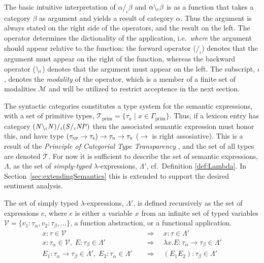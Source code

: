 The basic intuitive interpretation of $\alpha /_\iota \beta$ and $\alpha \backslash_\iota \beta$ is as a function that takes a category $\beta$ as argument and yields a result of category $\alpha$. Thus the argument is always stated on the right side of the operators, and the result on the left. The operator determines the dictionality of the application, i.e.\ \emph{where} the argument should appear relative to the function: the forward operator ($/_\iota$) denotes that the argument must appear on the right of the function, whereas the backward operator ($\backslash_\iota$) denotes that the argument must appear on the left. The subscript, $\iota$, denotes the \emph{modality} of the operator, which is a member of a finite set of modalities $\mathcal{M}$ and will be utilized to restrict acceptence in the next section. 

The syntactic categories constitutes a type system for the semantic expressions, with a set of primitive types, $\mathcal{T}_\mathrm{prim} = \{ \tau_x \; | \; x \in \Gamma_\mathrm{prim} \}$. Thus, if a lexicon entry has category $({\mathit{N}} \backslash_\iota {\mathit{N}}) /_\iota ({\mathit{S}} /_\iota {\mathit{NP}})$ then the associated semantic expression must honor this, and have type $(\tau_\textsc{np} \to \tau_\textsc{s}) \to \tau_\textsc{n} \to \tau_\textsc{n}$ ($\to$ is right assosiative). This is a result of the \emph{Principle of Categorial Type Transparency} \cite[Montague, 1974]{??}, and the set of all types are denoted $\mathcal{T}$. For now it is sufficient to describe the set of semantic expressions, $\Lambda$, as the set of \emph{simply-typed} $\lambda$-expressions, $\Lambda'$, cf.\ Definition \ref{def:Lambda}. In Section~\ref{sec:extendingSemantics} this is extended to support the desired sentiment analysis.

\begin{definition}
The set of simply typed $\lambda$-expressions, $\Lambda'$, is defined recursively as the set of expressions $e$, where $e$ is either a variable $x$ from an infinite set of typed variables $\mathcal{V} = \{ v_1 : \tau_\alpha, v_2 : \tau_\beta, \ldots \}$, a function abstraction, or a functional application.
\begin{align}
 x : \tau \in \mathcal{V}                      &\quad \Rightarrow \quad  x  : \tau \in \Lambda' \tag{Variable} \\
 x : \tau_\alpha \in \mathcal{V}, \; E : \tau_\beta \in \Lambda'          &\quad \Rightarrow \quad  \lambda x . E : \tau_\alpha \to \tau_\beta \in \Lambda' \tag{Abstraction} \\
 E_1 : \tau_\alpha \to \tau_\beta \in \Lambda', \; E_2 : \tau_\alpha \in \Lambda'   &\quad \Rightarrow \quad  (E_1 E_2) : \tau_\beta \in \Lambda' \tag{Application} 
 \label{eq:Lambda}
\end{align}
\label{def:Lambda}
\done
\end{definition}

